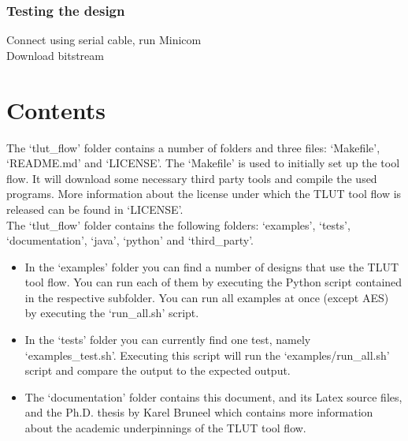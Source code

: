 \documentclass[a4paper,oneside]{memoir}
\begin{document}
\subsection{Testing the design}

Connect using serial cable, run Minicom \\
Download bitstream

\clearpage
\chapter{Contents}\label{sec:contents}
The `tlut\_flow' folder contains a number of folders and three files: `Makefile', `README.md' and `LICENSE'. 
The `Makefile' is used to initially set up the tool flow. It will download  some necessary third party tools and compile the used programs.
More information about the license under which the TLUT tool flow is released can be found in `LICENSE'.\\

The `tlut\_flow' folder contains the following folders:  `examples', `tests', `documentation',  `java', `python' and `third\_party'.

\begin{itemize}
\item In the `examples' folder you can find a number of designs that use the TLUT tool flow. You can run each of them by executing the Python script contained in the respective subfolder. You can run all examples at once (except AES) by executing the `run\_all.sh' script.
\item In the `tests' folder you can currently find one test, namely `examples\_test.sh'. Executing this script will run the `examples/run\_all.sh' script and compare the output to the expected output.
\item The `documentation' folder contains this document, and its Latex source files, and the Ph.D. thesis by Karel Bruneel which contains more information about the academic underpinnings of the TLUT tool flow.
\end{itemize}
\end{document}
